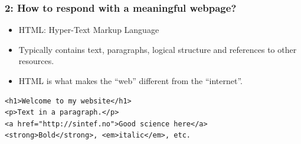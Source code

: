 \documentclass{beamer}
\begin{document}
\begin{frame}[fragile]
  \frametitle{2: How to respond with a meaningful webpage?}

  \begin{itemize}
  \item HTML: Hyper-Text Markup Language
  \item Typically contains text, paragraphs, logical structure and
    references to other resources.
  \item HTML is what makes the ``web'' different from the
    ``internet''.
  \end{itemize}

  \begin{lstlisting}[basicstyle=\ttfamily]
<h1>Welcome to my website</h1>
<p>Text in a paragraph.</p>
<a href="http://sintef.no">Good science here</a>
<strong>Bold</strong>, <em>italic</em>, etc.
  \end{lstlisting}
\end{frame}
\end{document}
